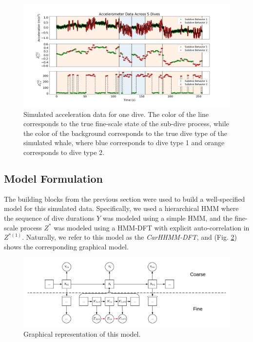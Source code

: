 \begin{figure}[ht]
	\centering
	\includegraphics[width=5in]{../Plots/sim_data.png}
	\caption{Simulated acceleration data for one dive. The color of the line corresponds to the true fine-scale state of the sub-dive process, while the color of the background corresponds to the true dive type of the simulated whale, where blue corresponds to dive type 1 and orange corresponds to dive type 2.}
	\label{fig:sim_data}
\end{figure}

\subsection{Model Formulation}
\label{subsec:model_structure}

The building blocks from the previous section were used to build a well-specified model for this simulated data. Specifically, we used a hierarchical HMM where the sequence of dive durations $Y$ was modeled using a simple HMM, and the fine-scale process $Z^*$ was modeled using a HMM-DFT with explicit auto-correlation in $Z^{*(1)}$. Naturally, we refer to this model as the \textit{CarHHMM-DFT}, and (Fig. \ref{fig:CarHHMM}) shows the corresponding graphical model.
%
\begin{figure}[ht]
	\centering
	\includegraphics[width=5in]{../Plots/CarHHMM.png}
	\caption{Graphical representation of this model.}
	\label{fig:CarHHMM}
\end{figure}
%

